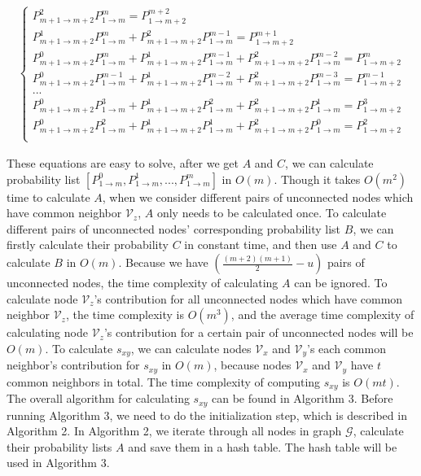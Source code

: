 \documentclass[\main/thesis.tex]{subfiles}
\begin{document}
\begin{align*}
\left\{
\begin{aligned}
P_{m+1\rightarrow m+2}^2 P_{1\rightarrow m}^{m} = P_{1\rightarrow m+2}^{m+2}\\
P_{m+1\rightarrow m+2}^1 P_{1\rightarrow m}^{m} + P_{m+1\rightarrow m+2}^2 P_{1\rightarrow m}^{m-1} = P_{1\rightarrow m+2}^{m+1}\\
P_{m+1\rightarrow m+2}^0 P_{1\rightarrow m}^{m} + P_{m+1\rightarrow m+2}^1 P_{1\rightarrow m}^{m-1} + P_{m+1\rightarrow m+2}^2 P_{1\rightarrow m}^{m-2} = P_{1\rightarrow m+2}^{m}\\
P_{m+1\rightarrow m+2}^0 P_{1\rightarrow m}^{m-1} + P_{m+1\rightarrow m+2}^1 P_{1\rightarrow m}^{m-2} + P_{m+1\rightarrow m+2}^2 P_{1\rightarrow m}^{m-3} = P_{1\rightarrow m+2}^{m-1}\\
...\\
P_{m+1\rightarrow m+2}^0 P_{1\rightarrow m}^{3} + P_{m+1\rightarrow m+2}^1 P_{1\rightarrow m}^{2} + P_{m+1\rightarrow m+2}^2 P_{1\rightarrow m}^{1} = P_{1\rightarrow m+2}^3\\
P_{m+1\rightarrow m+2}^0 P_{1\rightarrow m}^{2} + P_{m+1\rightarrow m+2}^1 P_{1\rightarrow m}^{1} + P_{m+1\rightarrow m+2}^2 P_{1\rightarrow m}^{0} = P_{1\rightarrow m+2}^2\\
\end{aligned}
\right.
\end{align*}

These equations are easy to solve, after we get $A$ and $C$, we can calculate probability list $[P_{1\rightarrow m}^0, P_{1\rightarrow m}^1, ..., P_{1\rightarrow m}^{m}]$ in $O(m)$. Though it takes $O(m^2)$ time to calculate $A$, when we consider different pairs of unconnected nodes which have common neighbor $\mathcal{V}_z$, $A$ only needs to be calculated once. To calculate different pairs of unconnected nodes' corresponding probability list $B$, we can firstly calculate their probability $C$ in constant time, and then use $A$ and $C$ to calculate $B$ in $O(m)$. Because we have $(\frac{(m+2)(m+1)}{2}-u)$ pairs of unconnected nodes, the time complexity of calculating $A$ can be ignored. To calculate node $\mathcal{V}_z$'s contribution for all unconnected nodes which have common neighbor $\mathcal{V}_z$, the time complexity is $O(m^3)$, and the average time complexity of calculating node $\mathcal{V}_z$'s contribution for a certain pair of unconnected nodes will be $O(m)$. To calculate $s_{xy}$, we can calculate nodes $\mathcal{V}_x$ and $\mathcal{V}_y$'s each common neighbor's contribution for $s_{xy}$ in $O(m)$, because nodes $\mathcal{V}_x$ and $\mathcal{V}_y$ have $t$ common neighbors in total. The time complexity of computing $s_{xy}$ is $O(mt)$. The overall algorithm for calculating $s_{xy}$ can be found in Algorithm 3. Before running Algorithm 3, we need to do the initialization step, which is described in Algorithm 2. In Algorithm 2, we iterate through all nodes in graph $\mathcal{G}$, calculate their probability lists $A$ and save them in a hash table. The hash table will be used in Algorithm 3.
\end{document}
